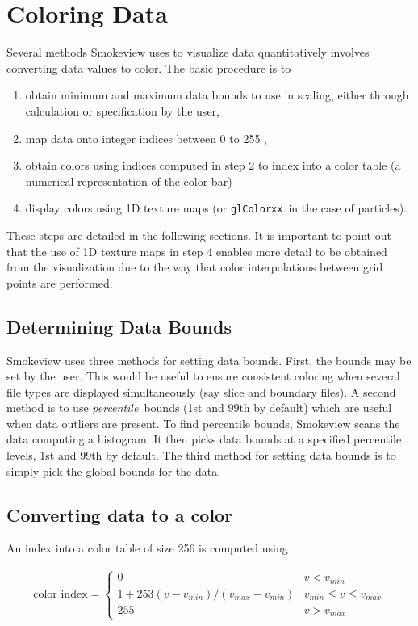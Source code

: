 \documentclass[11pt,twoside]{book}
\begin{document}
%
%

\section{Coloring Data}
Several methods Smokeview uses to visualize data quantitatively
involves converting data values to color. The basic procedure is
to
\begin{enumerate}
\item obtain minimum and maximum data bounds to use in scaling, either through calculation or specification by the user,
\item map data onto integer indices between 0 to 255 ,
\item obtain colors using indices computed in step 2 to index into a color table (a numerical representation of the color bar)
\item display colors using 1D texture maps (or {\tt glColorxx}\ in the case of particles).
\end{enumerate}
These steps are detailed in the following sections.   It is important to point out that the use of 1D texture maps in step 4 enables more detail to be obtained from the visualization due to the way that color interpolations between grid points are performed.

\subsection{Determining Data Bounds}Smokeview uses three methods for setting data bounds.  First, the bounds may be set by the user.  This would be useful to ensure consistent coloring when several file types are displayed simultaneously (say slice and boundary files).  A second method is to use {\em percentile}\ bounds (1st and 99th by default) which are useful when data outliers are present.  To find percentile bounds, Smokeview scans the data computing a histogram.  It then picks data bounds at a specified percentile levels, 1st and 99th by default.  The third method for setting data bounds is to simply pick the global bounds for the data.

\subsection{Converting data to a color}
An index into a color table of size 256 is computed using

\begin{eqnarray}
\mbox{color index}=\left\{
\begin{array}{ll}
  0 & v < v_{min}\\
  1+253(v-v_{min})/(v_{max}-v_{min}) & v_{min}\le v \le v_{max} \\
  255 & v > v_{max}
\end{array}
\right.
\end{eqnarray}
\end{document}
